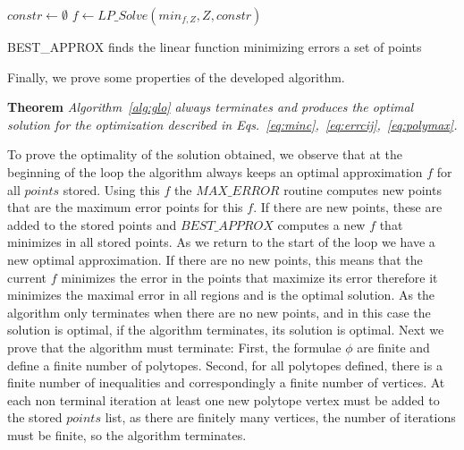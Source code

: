 \incmargin{1.5em}
\linesnumbered
\begin{algorithm}[!ht]
\dontprintsemicolon
{}
$constr \gets \emptyset$\;
\;
$f \gets LP\_Solve(min_{f,Z}, Z, constr)$\;	
\;
\caption{{\sc BEST\_APPROX} finds the linear function minimizing errors a set of points}
\label{alg:relaxApprox}
\end{algorithm}
\decmargin{1.5em}

Finally, we prove some properties of the developed algorithm.

{\bf Theorem} {\it Algorithm~\ref{alg:glo} always terminates and produces the optimal solution for the optimization described in Eqs.~\ref{eq:minc},~\ref{eq:errcij},~\ref{eq:polymax}.} 

To prove the optimality of the solution obtained, we observe that at the beginning of the loop the algorithm always keeps an optimal approximation $f$ for all $points$ stored. Using this $f$ the $MAX\_ERROR$ routine computes new points that are the maximum error points for this $f$. If there are new points, these are added to the stored points and $BEST\_APPROX$ computes a new $f$ that minimizes in all stored points. As we return to the start of the loop we have a new optimal approximation. If there are no new points, this means that the current $f$ minimizes the error in the points that maximize its error therefore it minimizes the maximal error in all regions and is the optimal solution.  As the algorithm only terminates when there are no new points, and in this case the solution is optimal, if the algorithm terminates, its solution is optimal.
 Next we prove that the algorithm must terminate: First, the formulae $\phi$  are finite and define a finite number of polytopes. Second, for all polytopes defined, there is a finite number of inequalities and correspondingly a finite number of vertices. At each non terminal iteration at least one new polytope vertex must be added to the stored $points$ list, as there are finitely many vertices, the number of iterations must be finite, so the algorithm terminates.





